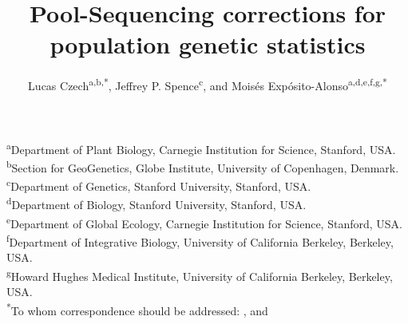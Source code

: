 \documentclass[letterpaper,fontsize=9pt,DIV=12]{scrartcl}
\title{Pool-Sequencing corrections for population genetic statistics}
\author{\orcid{0000-0002-1340-9644}Lucas Czech\textsuperscript{a,b,*}, \orcid{0000-0002-3199-1447}Jeffrey P. Spence\textsuperscript{c}, and \orcid{0000-0001-5711-0700}Moisés Expósito-Alonso\textsuperscript{a,d,e,f,g,*}}
\date{}
\newcommand{\beginsupplement}{%
    \setcounter{table}{0}
    \renewcommand{\thetable}{\arabic{table}}%
    \setcounter{figure}{0}
    \renewcommand{\thefigure}{\arabic{figure}}%
}
\begin{document}


\begingroup
\let\center\flushleft
\let\endcenter\endflushleft
\maketitle
\endgroup
\vspace*{-3.5em}
\textsuperscript{a}{Department of Plant Biology, Carnegie Institution for Science, Stanford, USA.\\}
\textsuperscript{b}{Section for GeoGenetics, Globe Institute, University of Copenhagen, Denmark.\\}
\textsuperscript{c}{Department of Genetics, Stanford University, Stanford, USA.\\}
\textsuperscript{d}{Department of Biology, Stanford University, Stanford, USA.\\}
\textsuperscript{e}{Department of Global Ecology, Carnegie Institution for Science, Stanford, USA.\\}
\textsuperscript{f}{Department of Integrative Biology, University of California Berkeley, Berkeley, USA.\\}
\textsuperscript{g}{Howard Hughes Medical Institute, University of California Berkeley, Berkeley, USA.\\}
\textsuperscript{*}{To whom correspondence should be addressed: \href{mailto:lczech@carnegiescience.edu}{\color{black}{lczech@carnegiescience.edu}},
and \href{mailto:moisesexpositoalonso@gmail.com}{\color{black}{moisesexpositoalonso@gmail.com}}}


\end{document}
